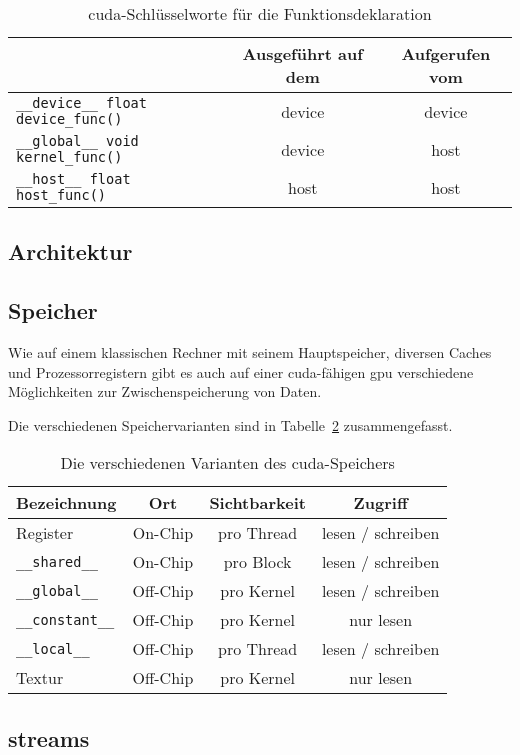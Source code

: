\begin{table}
    \centering
    \begin{tabular}{| l | c | c |}
        \hline
        & Ausgeführt auf dem & Aufgerufen vom \\
        \hline
        \texttt{\_\_device\_\_ float device\_func()} & \gls{device} & \gls{device} \\
        \hline
        \texttt{\_\_global\_\_ void kernel\_func()} & \gls{device} & \gls{host} \\
        \hline
        \texttt{\_\_host\_\_ float host\_func()} & \gls{host} & \gls{host} \\
        \hline
    \end{tabular}
    \caption{\gls{cuda}-Schlüsselworte für die Funktionsdeklaration}
    \label{table:cu_func_keywords}
\end{table}

\subsection{Architektur}\label{sssec:cu_arch}

\subsection{Speicher}\label{sssec:cu_mem}

Wie auf einem klassischen Rechner mit seinem Hauptspeicher, diversen Caches und Prozessorregistern gibt es auch auf
einer \gls{cuda}-fähigen \gls{gpu} verschiedene Möglichkeiten zur Zwischenspeicherung von Daten.

Die verschiedenen Speichervarianten sind in Tabelle~\ref{table:cu_mem_hierarchie} zusammengefasst.

\begin{table}
    \centering
    \begin{tabular}{| l | c | c | c |}
        \hline
        Bezeichnung & Ort & Sichtbarkeit & Zugriff\\
        \hline
        \hline
        Register & On-Chip & pro Thread & lesen / schreiben \\
        \hline
        \texttt{\_\_shared\_\_} & On-Chip & pro Block & lesen / schreiben \\
        \hline
        \texttt{\_\_global\_\_} & Off-Chip & pro Kernel & lesen / schreiben \\
        \hline
        \texttt{\_\_constant\_\_} & Off-Chip & pro Kernel & nur lesen \\
        \hline
        \texttt{\_\_local\_\_} & Off-Chip & pro Thread & lesen / schreiben\\
        \hline
        Textur & Off-Chip & pro Kernel & nur lesen\\
        \hline
    \end{tabular}
    \caption{Die verschiedenen Varianten des \gls{cuda}-Speichers}
    \label{table:cu_mem_hierarchie}
\end{table}

\subsection{\glspl{stream}}\label{ssec:cu_streams}
